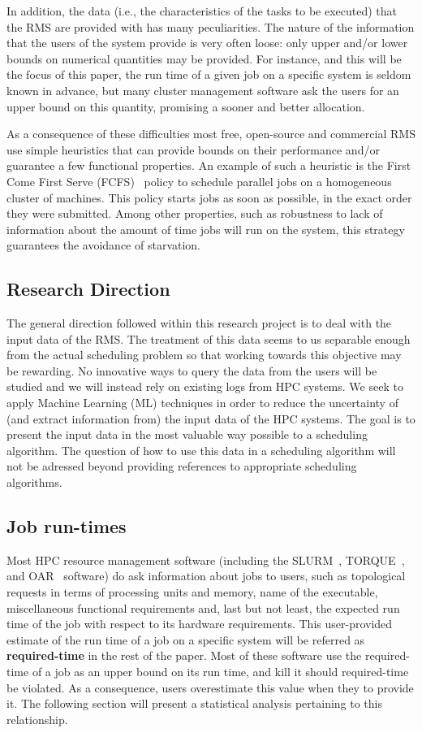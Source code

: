 \documentclass{article}
\begin{document}
In addition, the data (i.e., the characteristics of the tasks to be executed) that the RMS are provided with has many peculiarities.
The nature of the information that the users of the system provide is very often loose: only upper and/or lower bounds on numerical quantities may be provided.
For instance, and this will be the focus of this paper, the run time of a given job on a specific system is seldom known in advance, but many cluster management software ask the users for an upper bound on this quantity, promising a sooner and better allocation.

As a consequence of these difficulties most free, open-source and commercial RMS use simple heuristics that can provide bounds on their performance and/or guarantee a few functional properties.
An example of such a heuristic is the First Come First Serve (FCFS)~\cite{FCFS} policy to schedule parallel jobs on a homogeneous cluster of machines. This policy starts jobs as soon as possible, in the exact order they were submitted.
Among other properties, such as robustness to lack of information about the amount of time jobs will run on the system, this strategy guarantees the avoidance of starvation.

\subsection{Research Direction}
The general direction followed within this research project is to deal with the input data of the RMS.
The treatment of this data seems to us separable enough from the actual scheduling problem so that working towards this objective may be rewarding.
No innovative ways to query the data from the users will be studied and we will instead rely on existing logs from HPC systems. We seek to apply Machine Learning (ML) techniques in order to reduce the uncertainty of (and extract information from) the input data of the HPC systems.
The goal is to present the input data in the most valuable way possible to a scheduling algorithm. The question of how to use this data in a scheduling algorithm will not be adressed beyond providing references to appropriate scheduling algorithms.


\subsection{Job run-times}
Most HPC resource management software (including the SLURM~\cite{SLURM}, TORQUE~\cite{TORQUE}, and OAR~\cite{OAR} software) do ask information about jobs to users, such as topological requests in terms of processing units and memory, name of the executable, miscellaneous functional requirements and, last but not least, the expected run time of the job with respect to its hardware requirements.
This user-provided estimate of the run time of a job on a specific system will be referred as \textbf{required-time} in the rest of the paper. Most of these software use the required-time of a job as an upper bound on its run time, and kill it should required-time be violated. As a consequence, users overestimate this value when they to provide it. The following section will present a statistical analysis pertaining to this relationship.
\end{document}
